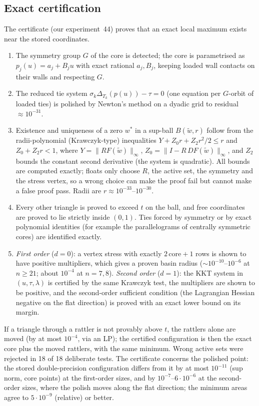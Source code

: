 \documentclass[11pt]{amsart}
\theoremstyle{definition}
\newcommand{\core}{\mathrm{core}}
\begin{document}
\subsection{Exact certification}\label{sec:cert}
The certificate (our experiment~44) proves that an exact local maximum exists near the stored coordinates. %
\begin{enumerate}[label=(\roman*)]
\item The symmetry group $G$ of the core is detected; the core is parametrised as $p_j(u) = a_j + B_j u$ with exact rational $a_j, B_j$, keeping loaded wall contacts on their walls and respecting $G$.
\item The reduced tie system $\sigma_k\Delta_{T_k}(p(u)) - \tau = 0$ (one equation per $G$-orbit of loaded ties) is polished by Newton's method on a dyadic grid to residual $\approx 10^{-31}$.
\item Existence and uniqueness of a zero $w^*$ in a sup-ball $B(\tilde w, r)$ follow from the radii-polynomial (Krawczyk-type) inequalities $Y + Z_0 r + Z_2 r^2/2 \le r$ and $Z_0 + Z_2 r < 1$, where $Y = \lVert R F(\tilde w)\rVert_\infty$, $Z_0 = \lVert I - R\,DF(\tilde w)\rVert_\infty$, and $Z_2$ bounds the constant second derivative (the system is quadratic). All bounds are computed exactly; floats only choose $R$, the active set, the symmetry and the stress vertex, so a wrong choice can make the proof fail but cannot make a false proof pass. Radii are $r \approx 10^{-33}$--$10^{-30}$.
\item Every other triangle is proved to exceed $t$ on the ball, and free coordinates are proved to lie strictly inside $(0,1)$. Ties forced by symmetry or by exact polynomial identities (for example the parallelograms of centrally symmetric cores) are identified exactly.
\item \emph{First order} ($d = 0$): a vertex stress with exactly $2\,\core + 1$ rows is shown to have positive multipliers, which gives a proven basin radius ($\sim10^{-10}$--$10^{-6}$ at $n \ge 21$; about $10^{-4}$ at $n = 7, 8$). \emph{Second order} ($d = 1$): the KKT system in $(u,\tau,\lambda)$ is certified by the same Krawczyk test, the multipliers are shown to be positive, and the second-order sufficient condition (the Lagrangian Hessian negative on the flat direction) is proved with an exact lower bound on its margin.
\end{enumerate}
If a triangle through a rattler is not provably above $t$, the rattlers alone are moved (by at most $10^{-4}$, via an LP); the certified configuration is then the exact core plus the moved rattlers, with the same minimum. %
Wrong active sets were rejected in 18 of 18 deliberate tests. The certificate concerns the polished point: the stored double-precision configuration differs from it by at most $10^{-11}$ (sup norm, core points) at the first-order sizes, and by $10^{-7}$--$6\cdot10^{-6}$ at the second-order sizes, where the polish moves along the flat direction; the minimum areas agree to $5\cdot10^{-9}$ (relative) or better. %
\end{document}
